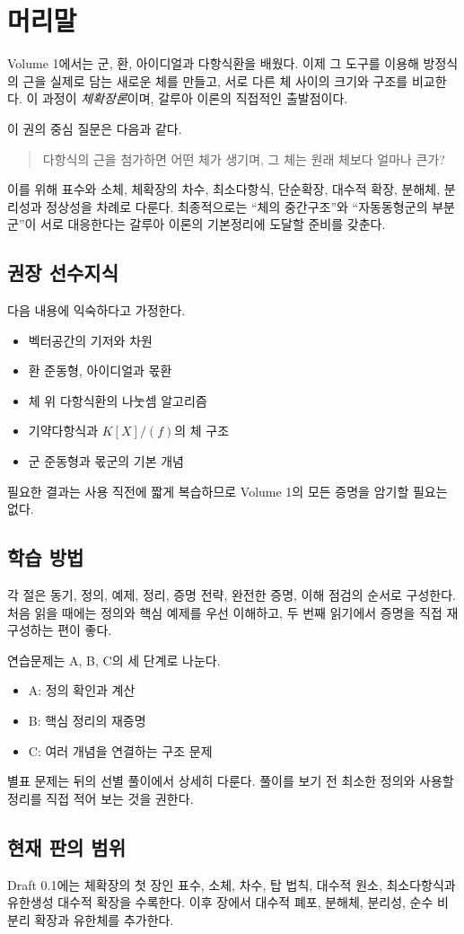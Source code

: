 \chapter*{머리말}

Volume 1에서는 군, 환, 아이디얼과 다항식환을 배웠다. 이제 그 도구를 이용해 방정식의 근을 실제로 담는 새로운 체를 만들고, 서로 다른 체 사이의 크기와 구조를 비교한다. 이 과정이 \emph{체확장론}이며, 갈루아 이론의 직접적인 출발점이다.

이 권의 중심 질문은 다음과 같다.

\begin{quote}
다항식의 근을 첨가하면 어떤 체가 생기며, 그 체는 원래 체보다 얼마나 큰가?
\end{quote}

이를 위해 표수와 소체, 체확장의 차수, 최소다항식, 단순확장, 대수적 확장, 분해체, 분리성과 정상성을 차례로 다룬다. 최종적으로는 ``체의 중간구조''와 ``자동동형군의 부분군''이 서로 대응한다는 갈루아 이론의 기본정리에 도달할 준비를 갖춘다.

\section*{권장 선수지식}

다음 내용에 익숙하다고 가정한다.

\begin{itemize}
  \item 벡터공간의 기저와 차원
  \item 환 준동형, 아이디얼과 몫환
  \item 체 위 다항식환의 나눗셈 알고리즘
  \item 기약다항식과 $K[X]/(f)$의 체 구조
  \item 군 준동형과 몫군의 기본 개념
\end{itemize}

필요한 결과는 사용 직전에 짧게 복습하므로 Volume 1의 모든 증명을 암기할 필요는 없다.

\section*{학습 방법}

각 절은 동기, 정의, 예제, 정리, 증명 전략, 완전한 증명, 이해 점검의 순서로 구성한다. 처음 읽을 때에는 정의와 핵심 예제를 우선 이해하고, 두 번째 읽기에서 증명을 직접 재구성하는 편이 좋다.

연습문제는 A, B, C의 세 단계로 나눈다.

\begin{itemize}
  \item A: 정의 확인과 계산
  \item B: 핵심 정리의 재증명
  \item C: 여러 개념을 연결하는 구조 문제
\end{itemize}

별표 문제는 뒤의 선별 풀이에서 상세히 다룬다. 풀이를 보기 전 최소한 정의와 사용할 정리를 직접 적어 보는 것을 권한다.

\section*{현재 판의 범위}

Draft 0.1에는 체확장의 첫 장인 표수, 소체, 차수, 탑 법칙, 대수적 원소, 최소다항식과 유한생성 대수적 확장을 수록한다. 이후 장에서 대수적 폐포, 분해체, 분리성, 순수 비분리 확장과 유한체를 추가한다.
